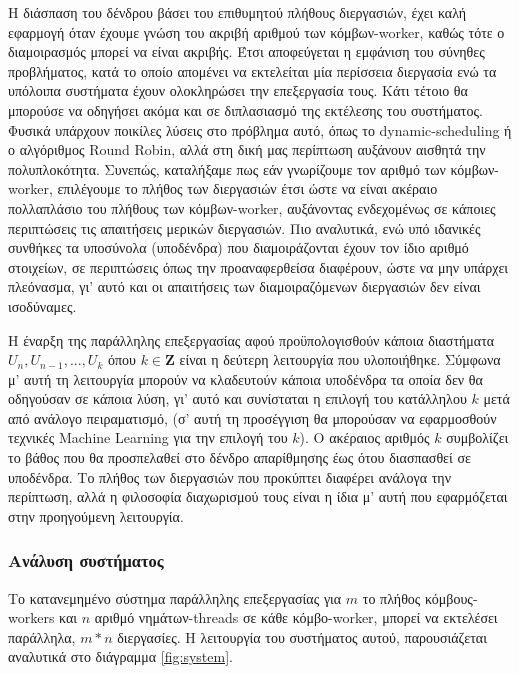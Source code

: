 Η διάσπαση του δένδρου βάσει του επιθυμητού πλήθους διεργασιών, έχει καλή εφαρμογή όταν έχουμε γνώση του ακριβή αριθμού των κόμβων-worker, καθώς τότε ο διαμοιρασμός μπορεί να είναι ακριβής. Έτσι αποφεύγεται η εμφάνιση του σύνηθες προβλήματος, κατά το οποίο απομένει να εκτελείται μία περίσσεια διεργασία ενώ τα υπόλοιπα συστήματα έχουν ολοκληρώσει την επεξεργασία τους. Κάτι τέτοιο θα μπορούσε να οδηγήσει ακόμα και σε διπλασιασμό της εκτέλεσης του συστήματος. Φυσικά υπάρχουν ποικίλες λύσεις στο πρόβλημα αυτό, όπως το dynamic-scheduling ή ο αλγόριθμος Round Robin, αλλά στη δική μας περίπτωση αυξάνουν αισθητά την πολυπλοκότητα. Συνεπώς, καταλήξαμε πως εάν γνωρίζουμε τον αριθμό των κόμβων-worker, επιλέγουμε το πλήθος των διεργασιών έτσι ώστε να είναι ακέραιο πολλαπλάσιο του πλήθους των κόμβων-worker, αυξάνοντας ενδεχομένως σε κάποιες περιπτώσεις τις απαιτήσεις μερικών διεργασιών. Πιο αναλυτικά, ενώ υπό ιδανικές συνθήκες τα υποσύνολα (υποδένδρα) που διαμοιράζονται έχουν τον ίδιο αριθμό στοιχείων, σε περιπτώσεις όπως την προαναφερθείσα διαφέρουν, ώστε να μην υπάρχει πλεόνασμα, γι' αυτό και οι απαιτήσεις των διαμοιραζόμενων διεργασιών δεν είναι ισοδύναμες.  

Η έναρξη της παράλληλης επεξεργασίας αφού προϋπολογισθούν κάποια διαστήματα $ U_n,U_{n-1},...,U_k $ όπου $ k \in \mathbf{Z} $ είναι η δεύτερη λειτουργία που υλοποιήθηκε. Σύμφωνα μ’ αυτή τη λειτουργία μπορούν να κλαδευτούν κάποια υποδένδρα τα οποία δεν θα οδηγούσαν σε κάποια λύση, γι’ αυτό και συνίσταται η επιλογή του κατάλληλου $k$ μετά από ανάλογο πειραματισμό, (σ’ αυτή τη προσέγγιση θα μπορούσαν να εφαρμοσθούν τεχνικές Machine Learning για την επιλογή του $ k $). Ο ακέραιος αριθμός $ k $ συμβολίζει το βάθος που θα προσπελαθεί στο δένδρο απαρίθμησης έως ότου διασπασθεί σε υποδένδρα. Το πλήθος των διεργασιών που προκύπτει διαφέρει ανάλογα την περίπτωση, αλλά η φιλοσοφία διαχωρισμού τους είναι η ίδια μ' αυτή που εφαρμόζεται στην προηγούμενη λειτουργία. 

\subsubsection{Ανάλυση συστήματος}

Το κατανεμημένο σύστημα παράλληλης επεξεργασίας για $ m $ το πλήθος κόμβους-workers και $ n $ αριθμό νημάτων-threads σε κάθε κόμβο-worker, μπορεί να εκτελέσει παράλληλα, $ m*n $ διεργασίες. Η λειτουργία του συστήματος αυτού, παρουσιάζεται αναλυτικά στο διάγραμμα \ref{fig:system}. 

